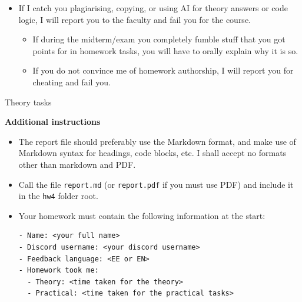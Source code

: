 \documentclass{homework}
\begin{document}
\begin{itemize}
\begin{itemize}
  \end{itemize}
  \item If I catch you plagiarising, copying, or using AI for theory answers or code logic, I will report you to the faculty and fail you for the course.
  \begin{itemize}
    \item If during the midterm/exam you completely fumble stuff that you got points for in homework tasks, you will have to orally explain why it is so.
    \item If you do not convince me of homework authorship, I will report you for cheating and fail you.
  \end{itemize}
\end{itemize}

\newpage

\begin{center}
  Theory tasks
\end{center}

\textbf{Additional instructions}

\begin{itemize}
  \item The report file should preferably use the Markdown format, and make use of Markdown syntax for headings, code blocks, etc.
  I shall accept no formats other than markdown and PDF.
  \item Call the file \texttt{report.md} (or \texttt{report.pdf} if you must use PDF) and include it in the \texttt{hw4} folder root.
  \item Your homework must contain the following information at the start:
\begin{Verbatim}
- Name: <your full name>
- Discord username: <your discord username>
- Feedback language: <EE or EN>
- Homework took me:
  - Theory: <time taken for the theory>
  - Practical: <time taken for the practical tasks>
\end{Verbatim}
\end{itemize}
\end{document}
